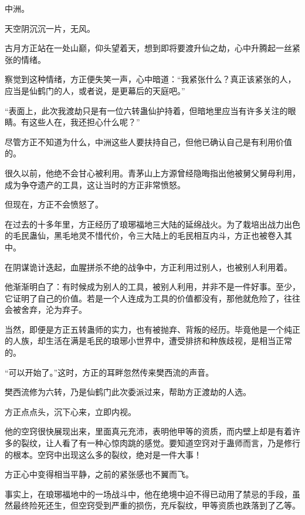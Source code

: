 
\begin{this_body}



中洲。

天空阴沉沉一片，无风。

古月方正站在一处山巅，仰头望着天，想到即将要渡升仙之劫，心中升腾起一丝紧张的情绪。

察觉到这种情绪，方正便失笑一声，心中暗道：“我紧张什么？真正该紧张的人，应当是仙鹤门的人，或者说，是更幕后的天庭吧。”

“表面上，此次我渡劫只是有一位六转蛊仙护持着，但暗地里应当有许多关注的眼睛。有这些人在，我还担心什么呢？”

尽管方正不知道为什么，中洲这些人要扶持自己，但他已确认自己是有利用价值的。

很久以前，他绝不会甘心被利用。青茅山上方源曾经隐晦指出他被舅父舅母利用，成为争夺遗产的工具，这让当时的方正非常愤怒。

但现在，方正不会愤怒了。

在过去的十多年里，方正经历了琅琊福地三大陆的延绵战火。为了栽培出战力出色的毛民蛊仙，黑毛地灵不惜代价，令三大陆上的毛民相互内斗，方正也被卷入其中。

在阴谋诡计迭起，血腥拼杀不绝的战争中，方正利用过别人，也被别人利用着。

他渐渐明白了：有时候成为别人的工具，被别人利用，并非不是一件好事。至少，它证明了自己的价值。若是一个人连成为工具的价值都没有，那他就危险了，往往会被舍弃，沦为弃子。

当然，即便是方正五转蛊师的实力，也有被抛弃、背叛的经历。毕竟他是一个纯正的人族，却生活在满是毛民的琅琊小世界中，遭受排挤和种族歧视，是相当正常的。

“可以开始了。”这时，方正的耳畔忽然传来樊西流的声音。

樊西流修为六转，乃是仙鹤门此次委派过来，帮助方正渡劫的人选。

方正点点头，沉下心来，立即内视。

他的空窍很快展现出来，里面真元充沛，表明他甲等的资质，而内壁上却是有着许多的裂纹，让人看了有一种心惊肉跳的感觉。要知道空窍对于蛊师而言，乃是修行的根本。空窍中出现这么多的裂纹，绝对是一件大事！

方正心中变得相当平静，之前的紧张感也不翼而飞。

事实上，在琅琊福地中的一场战斗中，他在绝境中迫不得已动用了禁忌的手段，虽然最终险死还生，但空窍受到严重的损伤，充斥裂纹，甲等资质也跌落到了乙等。


\end{this_body}
